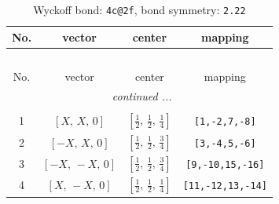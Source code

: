 \documentclass[fleqn,8pt]{jsarticle}
\begin{document}
\renewcommand{\arraystretch}{1.2}
\begin{longtable}{cccc}
\caption{Wyckoff bond: {\tt 4c@2f}, bond symmetry: {\tt 2.22}}
 \\
 \hline \hline
No. & vector & center & mapping \\ \hline \endfirsthead

\multicolumn{3}{l}{\tablename\ \thetable{}} \\
 \hline \hline
No. & vector & center & mapping \\ \hline \endhead

 \hline \hline
\multicolumn{3}{r}{\footnotesize\it continued ...} \\ \endfoot

 \hline \hline
\multicolumn{3}{r}{} \\ \endlastfoot

1 & $\left[ X,\, X,\, 0 \right]$ & $\left[ \frac{1}{2},\, \frac{1}{2},\, \frac{1}{4} \right]$ & {\tt [1,-2,7,-8]} \\ \hline
2 & $\left[ - X,\, X,\, 0 \right]$ & $\left[ \frac{1}{2},\, \frac{1}{2},\, \frac{3}{4} \right]$ & {\tt [3,-4,5,-6]} \\ \hline
3 & $\left[ - X,\, - X,\, 0 \right]$ & $\left[ \frac{1}{2},\, \frac{1}{2},\, \frac{3}{4} \right]$ & {\tt [9,-10,15,-16]} \\ \hline
4 & $\left[ X,\, - X,\, 0 \right]$ & $\left[ \frac{1}{2},\, \frac{1}{2},\, \frac{1}{4} \right]$ & {\tt [11,-12,13,-14]} \\
\end{longtable}
\renewcommand{\arraystretch}{1.2}
\end{document}
